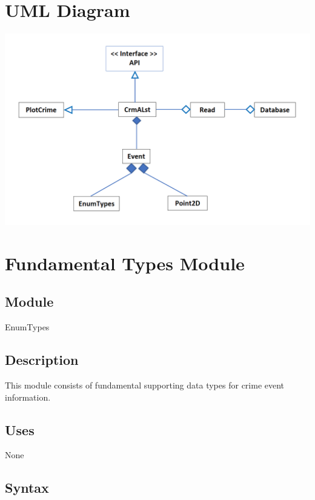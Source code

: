 \documentclass[12pt]{article}
\begin{document}
\section* {UML Diagram}

\begin{center}
\includegraphics[scale = 0.80]{UML.png}
\end{center}
 
\newpage



\section* {Fundamental Types Module}

\subsection*{Module}

EnumTypes

\subsection* {Description}
This module consists of fundamental supporting data types for crime event information.

\subsection* {Uses}

None

\subsection* {Syntax}
\end{document}
